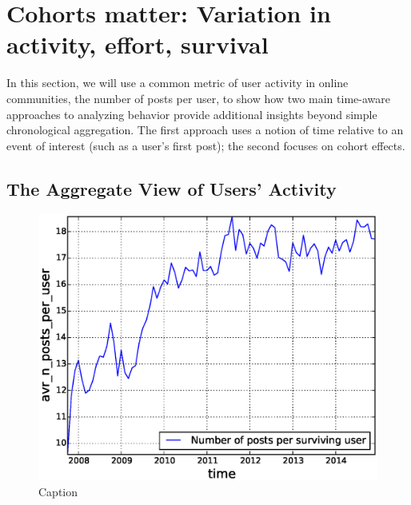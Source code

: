 \section{Cohorts matter: Variation in activity, effort, survival}

In this section, we will use a common metric of user activity in online communities, the number of posts per user, to show how two main time-aware approaches to analyzing behavior provide additional insights beyond simple chronological aggregation.  The first approach uses a notion of time relative to an event of interest (such as a user's first post); the second focuses on cohort effects.

\subsection{The Aggregate View of Users' Activity}

\begin{figure}[!tb]
\centering
\includegraphics[scale=0.4]{./images/avr_posts_per_user_over_time_total.eps}
\caption{Caption}
\label{fig:avr_posts_per_user_over_time_total}
\end{figure}

